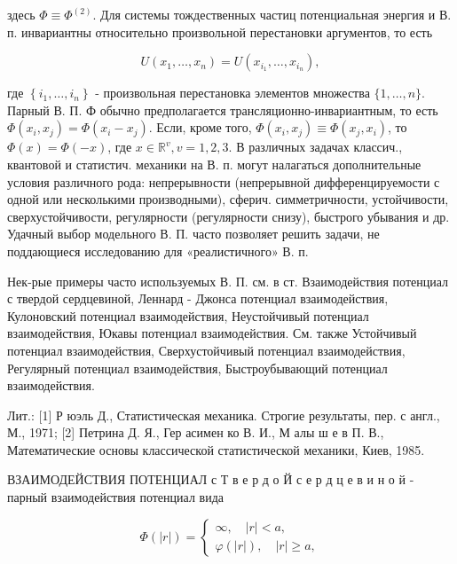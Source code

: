 \documentclass[10pt]{article}
\begin{document}
здесь $\Phi \equiv \Phi^{(2)}$. Для системы тождественных частиц потенциальная энергия и В. п. инвариантны относительно произвольной перестановки аргументов, то есть



\[

U\left(x_{1}, \ldots, x_{n}\right)=U\left(x_{i_{1}}, \ldots, x_{i_{n}}\right),

\]



где $\left\{i_{1}, \ldots, i_{n}\right\}$ - произвольная перестановка элементов множества $\{1, \ldots, n\}$. Парный В. П. Ф обычно предполагается трансляционно-инвариантным, то есть $\Phi\left(x_{i}, x_{j}\right)=\Phi\left(x_{i}-x_{j}\right)$. Если, кроме того, $\Phi\left(x_{i}, x_{j}\right) \equiv \Phi\left(x_{j}, x_{i}\right)$, то $\Phi(x)=\Phi(-x)$, где $x \in \mathbb{R}^{v}, v=1,2,3$. В различных задачах классич., квантовой и статистич. механики на В. п. могут налагаться дополнительные условия различного рода: непрерывности (непрерывной дифференцируемости с одной или несколькими производными), сферич. симметричности, устойчивости, сверхустойчивости, регулярности (регулярности снизу), быстрого убывания и др. Удачный выбор модельного В. П. часто позволяет решить задачи, не поддающиеся исследованию для «реалистичного» В. п.



Нек-рые примеры часто используемых В. П. см. в ст. Взаимодействия потенциал с твердой сердцевиной, Леннард - Джонса потенциал взаимодействия, Кулоновский потенциал взаимодействия, Неустойчивый потенциал взаимодействия, Юкавы потенциал взаимодействия. См. также Устойчивый потенциал взаимодействия, Сверхустойчивый потенциал взаимодействия, Регулярный потенциал взаимодействия, Быстроубывающий потенциал взаимодействия.



Лит.: [1] Р юэль Д., Статистическая механика. Строгие результаты, пер. с англ., М., 1971; [2] Петрина Д. Я., Гер асимен ко В. И., М алы ш е в П. В., Математические основы классической статистической механики, Киев, 1985.



ВЗАИМОДЕЙСТВИЯ ПОТЕНЦИАЛ с Т в е р д о Й с е р д ц е в и н о й - парный взаимодействия потенциал вида



\[

\Phi(|r|)=\left\{\begin{array}{l}

\infty, \quad|r|<a, \\

\varphi(|r|), \quad|r| \geqslant a,

\end{array}\right.

\]
\end{document}
